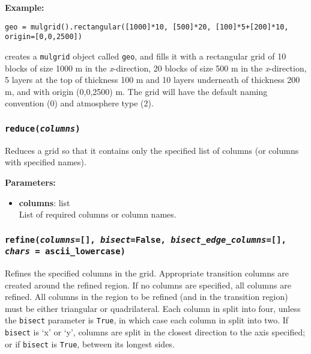 \textbf{Example:}

\begin{lstlisting}
geo = mulgrid().rectangular([1000]*10, [500]*20, [100]*5+[200]*10, origin=[0,0,2500])
\end{lstlisting}

creates a \texttt{mulgrid} object called \texttt{geo}, and fills it with a rectangular grid of 10 blocks of size 1000 m in the \emph{x}-direction, 20 blocks of size 500 m in the \emph{x}-direction, 5 layers at the top of thickness 100 m and 10 layers underneath of thickness 200 m, and with origin (0,0,2500) m.  The grid will have the default naming convention (0) and atmosphere type (2).

\begin{snugshade}\subsubsection{\texttt{reduce(\emph{columns})}}\end{snugshade}
\label{sec:mulgrid:reduce}

Reduces a grid so that it contains only the specified list of columns (or columns with specified names).

\textbf{Parameters:}
\begin{itemize}
  \item \textbf{columns}: list\\
    List of required columns or column names.
\end{itemize}

\begin{snugshade}\subsubsection{\texttt{refine(\emph{columns}=[], \emph{bisect}=False, \emph{bisect\_edge\_columns}=[],\\
    \emph{chars} = ascii\_lowercase)}}\end{snugshade}
\label{sec:mulgrid:refine}

Refines the specified columns in the grid.  Appropriate transition columns are created around the refined region.  If no columns are specified, all columns are refined.  All columns in the region to be refined (and in the transition region) must be either triangular or quadrilateral.  Each column in split into four, unless the \texttt{bisect} parameter is \texttt{True}, in which case each column in split into two.  If \texttt{bisect} is `x' or `y', columns are split in the closest direction to the axis specified; or if \texttt{bisect} is \texttt{True}, between its longest sides.

